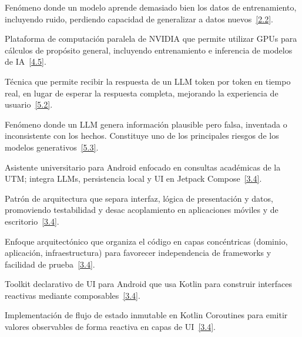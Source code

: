 \documentclass[12pt,a4paper]{report}
\numberwithin{figure}{section}
\begin{document}
\begin{description}[style=nextline, leftmargin=1.5cm, labelwidth=1.3cm]
\item[\textbf{Overfitting (Sobreajuste):}] \label{glos:overfitting} Fenómeno donde un modelo aprende demasiado bien los datos de entrenamiento, incluyendo ruido, perdiendo capacidad de generalizar a datos nuevos~\hyperref[ref:2]{[2.2]}.

\item[\textbf{CUDA:}] \label{glos:cuda} Plataforma de computación paralela de NVIDIA que permite utilizar GPUs para cálculos de propósito general, incluyendo entrenamiento e inferencia de modelos de IA~\hyperref[ref:4]{[4.5]}.

\item[\textbf{Streaming:}] \label{glos:streaming} Técnica que permite recibir la respuesta de un LLM token por token en tiempo real, en lugar de esperar la respuesta completa, mejorando la experiencia de usuario~\hyperref[ref:5]{[5.2]}.

\item[\textbf{Alucinación (\textit{Hallucination}):}] \label{glos:alucinacion} Fenómeno donde un LLM genera información plausible pero falsa, inventada o inconsistente con los hechos. Constituye uno de los principales riesgos de los modelos generativos~\hyperref[ref:5]{[5.3]}.

\item[\textbf{Kuiti:}] \label{glos:kuiti} Asistente universitario para Android enfocado en consultas académicas de la UTM; integra LLMs, persistencia local y UI en Jetpack Compose~\hyperref[ref:3.4]{[3.4]}.

\item[\textbf{MVVM (Model-View-ViewModel):}] \label{glos:mvvm} Patrón de arquitectura que separa interfaz, lógica de presentación y datos, promoviendo testabilidad y desac acoplamiento en aplicaciones móviles y de escritorio~\hyperref[ref:3.4]{[3.4]}.

\item[\textbf{Clean Architecture:}] \label{glos:clean} Enfoque arquitectónico que organiza el código en capas concéntricas (dominio, aplicación, infraestructura) para favorecer independencia de frameworks y facilidad de prueba~\hyperref[ref:3.4]{[3.4]}.

\item[\textbf{Jetpack Compose:}] \label{glos:compose} Toolkit declarativo de UI para Android que usa Kotlin para construir interfaces reactivas mediante composables~\hyperref[ref:3.4]{[3.4]}.

\item[\textbf{StateFlow:}] \label{glos:stateflow} Implementación de flujo de estado inmutable en Kotlin Coroutines para emitir valores observables de forma reactiva en capas de UI~\hyperref[ref:3.4]{[3.4]}.


\end{description}
\end{document}
